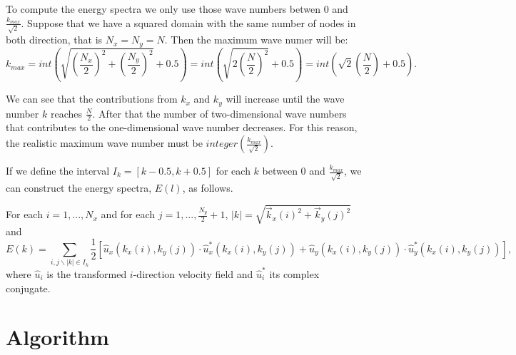 \begin{itemize}
To compute the energy spectra we only use those wave numbers betwen $0$ and $\frac{k_{max}}{\sqrt{2}}$. Suppose that we have a squared domain with the same number of nodes in both direction, that is $N_x=N_y=N$. Then the maximum wave numer will be:
\begin{equation}
\label{1.12.7}
k_{max}=int\left(\sqrt{\left(\frac{N_x}{2}\right)^2+\left(\frac{N_y}{2}\right)^2}+0.5\right)=int\left(\sqrt{2\left(\frac{N}{2}\right)^2}+0.5\right)=int\left(\sqrt{2}\left(\frac{N}{2}\right)+0.5\right).
\end{equation}

We can see that the contributions from $k_x$ and $k_y$ will increase until the wave number $k$ reaches $\frac{N}{2}$. After that the number of two-dimensional wave numbers that contributes to the one-dimensional wave number decreases. For this reason, the realistic maximum wave number must be $integer\left(\frac{k_{max}}{\sqrt{2}}\right)$.

If we define the interval $I_k=[k-0.5,k+0.5]$ for each $k$ between $0$ and $\frac{k_{max}}{\sqrt{2}}$, we can construct the energy spectra, $E(l)$, as follows.

For each $i=1,...,N_x$ and for each $j=1,...,\frac{N_y}{2}+1$, $|k|=\sqrt{\vec{k}_x(i)^2+\vec{k}_y(j)^2}$ and 
\begin{equation}
\label{1.12.8}
E(k)=\sum_{i,j\backslash|k|\in I_k}\frac{1}{2}\left[\hat{u}_x(k_x(i),k_y(j))\cdot\hat{u}_x^*(k_x(i),k_y(j))+\hat{u}_y(k_x(i),k_y(j))\cdot\hat{u}_y^*(k_x(i),k_y(j))\right],
\end{equation}
where $\hat{u}_i$ is the transformed $i$-direction velocity field and $\hat{u}_i^*$ its complex conjugate.

\end{itemize}

\section{Algorithm}
\begin{center}
\end{center}